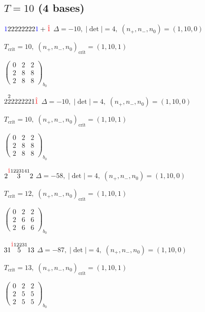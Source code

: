 \documentclass[10pt]{article}
\begin{document}
\subsection*{$T = 10$ \quad (4 bases)}
\smallskip

$\textcolor{blue}{1}22222222\textcolor{blue}{1}+\textcolor{red}{\hat{1}}$ \quad $\Delta=-10,\; |\det|=4,\; (n_+,n_-,n_0)=(1,10,0)$

\hspace{1em}$T_{\text{crit}}=10,\; (n_+,n_-,n_0)_{\text{crit}}=(1,10,1)$

\hspace{2em}$\left(\begin{smallmatrix}0 & 2 & 2 \\ 2 & 8 & 8 \\ 2 & 8 & 8\end{smallmatrix}\right)_{\!b_0}$

\smallskip

$2\overset{2}{2}2222221\textcolor{red}{\hat{1}}$ \quad $\Delta=-10,\; |\det|=4,\; (n_+,n_-,n_0)=(1,10,0)$

\hspace{1em}$T_{\text{crit}}=10,\; (n_+,n_-,n_0)_{\text{crit}}=(1,10,1)$

\hspace{2em}$\left(\begin{smallmatrix}0 & 2 & 2 \\ 2 & 8 & 8 \\ 2 & 8 & 8\end{smallmatrix}\right)_{\!b_0}$

\smallskip

$2\overset{\textcolor{red}{\hat{1}}1223141}{3}2$ \quad $\Delta=-58,\; |\det|=4,\; (n_+,n_-,n_0)=(1,10,0)$

\hspace{1em}$T_{\text{crit}}=12,\; (n_+,n_-,n_0)_{\text{crit}}=(1,10,1)$

\hspace{2em}$\left(\begin{smallmatrix}0 & 2 & 2 \\ 2 & 6 & 6 \\ 2 & 6 & 6\end{smallmatrix}\right)_{\!b_0}$

\smallskip

$31\overset{\textcolor{red}{\hat{1}}12231}{5}13$ \quad $\Delta=-87,\; |\det|=4,\; (n_+,n_-,n_0)=(1,10,0)$

\hspace{1em}$T_{\text{crit}}=13,\; (n_+,n_-,n_0)_{\text{crit}}=(1,10,1)$

\hspace{2em}$\left(\begin{smallmatrix}0 & 2 & 2 \\ 2 & 5 & 5 \\ 2 & 5 & 5\end{smallmatrix}\right)_{\!b_0}$
\end{document}
